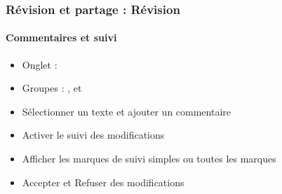 \documentclass[xcolor=table]{beamer}
\begin{document}

\begin{frame}[t]
\frametitle{Révision et partage : Révision}
\framesubtitle{Commentaires et suivi}

\begin{minipage}{0.39\textwidth}
	\begin{itemize}
		\item Onglet : 
		\item Groupes : ,  et 
	\end{itemize}
\end{minipage}
\begin{minipage}{0.6\textwidth}
\end{minipage}

\begin{minipage}{0.69\textwidth}
	\begin{itemize}
		\item Sélectionner un texte et ajouter un commentaire 
		\item Activer le suivi des modifications
		\item Afficher les marques de suivi simples ou toutes les marques
		\item Accepter et Refuser des modifications
	\end{itemize}
\end{minipage}
\begin{minipage}{0.30\textwidth}
	
	
	
\end{minipage}

\end{frame}

\end{document}

